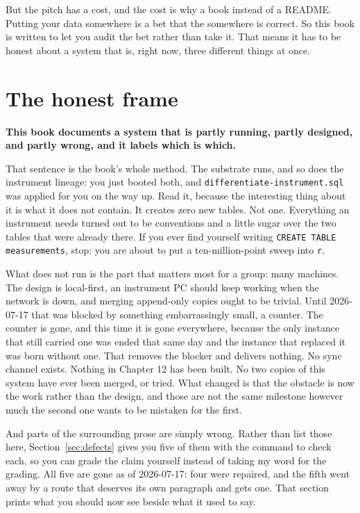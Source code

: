 But the pitch has a cost, and the cost is why a book instead of a README. Putting your data somewhere is a bet that the somewhere is correct. So this book is written to let you audit the bet rather than take it. That means it has to be honest about a system that is, right now, three different things at once.

\section{The honest frame}

\textbf{This book documents a system that is partly running, partly designed, and partly wrong, and it labels which is which.}

That sentence is the book's whole method. The substrate runs, and so does the instrument lineage: you just booted both, and \texttt{differentiate-instrument.sql} was applied for you on the way up. Read it, because the interesting thing about it is what it does not contain. It creates zero new tables. Not one. Everything an instrument needs turned out to be conventions and a little sugar over the two tables that were already there. If you ever find yourself writing \texttt{CREATE TABLE measurements}, stop: you are about to put a ten-million-point sweep into \texttt{r}.

What does not run is the part that matters most for a group: many machines. The design is local-first, an instrument PC should keep working when the network is down, and merging append-only copies ought to be trivial. Until 2026-07-17 that was blocked by something embarrassingly small, a counter. The counter is gone, and this time it is gone everywhere, because the only instance that still carried one was ended that same day and the instance that replaced it was born without one. That removes the blocker and delivers nothing. No sync channel exists. Nothing in Chapter 12 has been built. No two copies of this system have ever been merged, or tried. What changed is that the obstacle is now the work rather than the design, and those are not the same milestone however much the second one wants to be mistaken for the first.

And parts of the surrounding prose are simply wrong. Rather than list those here, Section~\ref{sec:defects} gives you five of them with the command to check each, so you can grade the claim yourself instead of taking my word for the grading. All five are gone as of 2026-07-17: four were repaired, and the fifth went away by a route that deserves its own paragraph and gets one. That section prints what you should now see beside what it used to say.

